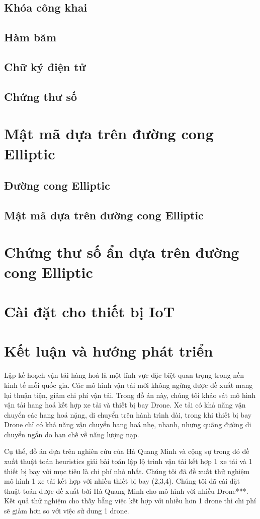 \documentclass[a4paper,12pt]{report}
\begin{document}
\section{Khóa công khai}
\section{Hàm băm}
\section{Chữ ký điện tử}
\section{Chứng thư số}
\chapter{Mật mã dựa trên đường cong Elliptic}
\section{Đường cong Elliptic}
\section{Mật mã dựa trên đường cong Elliptic}
\chapter{Chứng thư số ẩn dựa trên đường cong Elliptic}
\chapter{Cài đặt cho thiết bị IoT}
\chapter*{Kết luận và hướng phát triển}
Lập kế hoạch vận tải hàng hoá là một lĩnh vực đặc biệt quan trọng trong nền kinh tế mỗi quốc gia. Các mô hình vận tải mới không ngừng được đề xuất mang lại thuận tiện, giảm chi phí vận tải. Trong đồ án này, chúng tôi khảo sát mô hình vận tải hang hoá kết hợp xe tải và thiết bị bay Drone. Xe tải có khả năng vận chuyển các hang hoá nặng, di chuyển trên hành trình dài, trong khi thiết bị bay Drone chỉ có khả năng vận chuyển hang hoá nhẹ, nhanh, nhưng quãng đường di chuyển ngắn do hạn chế về năng lượng nạp. 

Cụ thể, đồ án dựa trên nghiên cứu của Hà Quang Minh và cộng sự trong đó đề xuất thuật toán heuristics giải bài toán lập lộ trình vận tải kết hợp 1 xe tải và 1 thiết bị bay với mục tiêu là chi phí nhỏ nhất. Chúng tôi đã đề xuất thử nghiệm mô hình 1 xe tải kết hợp với nhiều thiết bị bay (2,3,4). Chúng tôi đã cài đặt thuật toán được đề xuất bởi Hà Quang Minh cho mô hình với nhiều Drone***. Kết quả thử nghiệm cho thấy bằng việc kết hợp với nhiều hơn 1 drone thì chi phí sẽ giảm hơn so với việc sử dung 1 drone.
\end{document}
